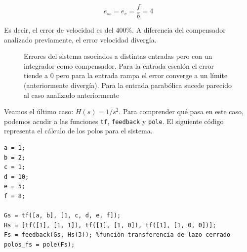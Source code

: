 \begin{equation}
    e_{ss} = e_v = \frac{f}{b} = 4
\end{equation}


\noindent Es decir, el error de velocidad es del $400\%$. A diferencia del compensador analizado previamente, el error velocidad divergía. 


\begin{figure}[ht!]
    \centering
    \caption{Errores del sistema asociados a distintas entradas pero con un integrador como compensador. Para la entrada escalón el error tiende a 0 pero para la entrada rampa el error converge a un límite (anteriormente divergía). Para la entrada parabólica sucede parecido al caso analizado anteriormente}
    \label{fig:errores2}
\end{figure}





Veamos el último caso: $H(s) = 1/s^2$. Para comprender qué pasa en este caso, podemos acudir a las funciones \texttt{tf}, \texttt{feedback} y \texttt{pole}. El siguiente código representa el cálculo de los polos para el sistema.



\begin{lstlisting}[caption = {Cálculo de los polos al sistema}, label = {cod:3}]
a = 1;
b = 2;
c = 1;
d = 10;
e = 5;
f = 8;

Gs = tf([a, b], [1, c, d, e, f]);
Hs = [tf([1], [1, 1]), tf([1], [1, 0]), tf([1], [1, 0, 0])];
Fs = feedback(Gs, Hs(3)); %función transferencia de lazo cerrado
polos_fs = pole(Fs);
\end{lstlisting}


